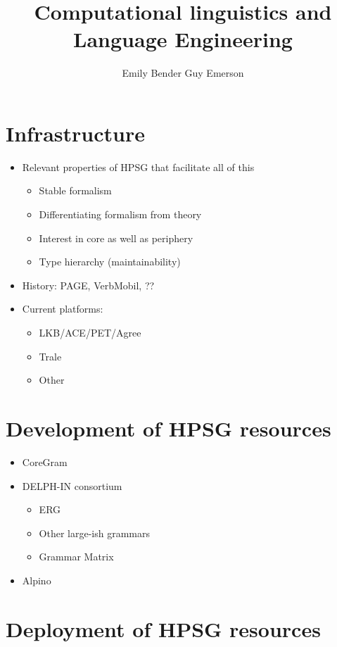 \documentclass[output=paper]{langsci/langscibook}
\author{%
	Emily Bender\affiliation{University of Washington} \lastand
Guy Emerson\affiliation{Cambridge University}
}
\title{Computational linguistics and Language Engineering}
\begin{document}
\section{Infrastructure}

\begin{itemize}
\item Relevant properties of HPSG that facilitate all of this
    \begin{itemize}
    \item Stable formalism
    \item Differentiating formalism from theory
    \item Interest in core as well as periphery
    \item Type hierarchy (maintainability)
    \end{itemize}
\item History: PAGE, VerbMobil, ??
\item Current platforms:
    \begin{itemize}
    \item LKB/ACE/PET/Agree
    \item Trale
    \item Other
    \end{itemize}
\end{itemize}

\section{Development of HPSG resources}


\begin{itemize}
 \item  CoreGram
 \item  DELPH-IN consortium
    \begin{itemize}
    \item ERG
    \item Other large-ish grammars
    \item Grammar Matrix
    \end{itemize}
 \item Alpino
\end{itemize}

\section{Deployment of HPSG resources}
\end{document}
